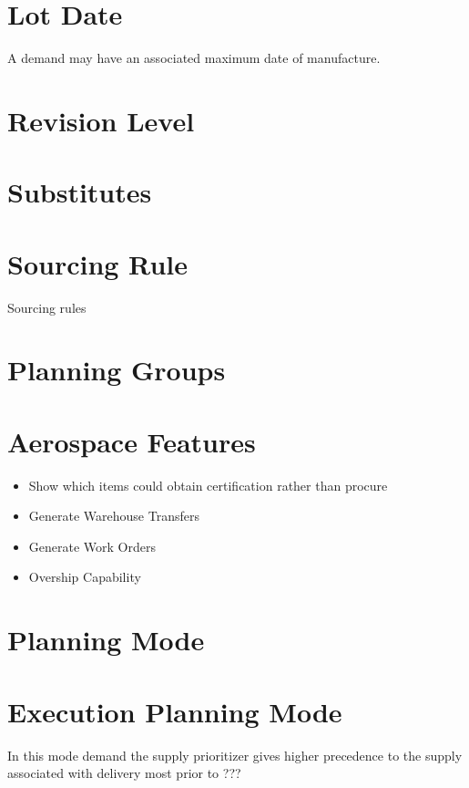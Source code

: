 \documentclass[letterpaper,10pt,english]{sphinxmanual}
\begin{document}
\section{Lot Date}
\label{APS/ApsFeatures:id27}
A demand may have an associated maximum date of manufacture.


\section{Revision Level}
\label{APS/ApsFeatures:id28}

\section{Substitutes}
\label{APS/ApsFeatures:id29}

\section{Sourcing Rule}
\label{APS/ApsFeatures:id30}
Sourcing rules


\section{Planning Groups}
\label{APS/ApsFeatures:planning-groups}

\section{Aerospace Features}
\label{APS/ApsFeatures:aerospace-features}\begin{itemize}
\item {} 
Show which items could obtain certification rather than procure

\item {} 
Generate Warehouse Transfers

\item {} 
Generate Work Orders

\item {} 
Overship Capability

\end{itemize}


\section{Planning Mode}
\label{APS/ApsFeatures:planning-mode}

\section{Execution Planning Mode}
\label{APS/ApsFeatures:execution-planning-mode}
In this mode demand the supply prioritizer gives higher precedence to
the supply associated with delivery most prior to ???
\end{document}
